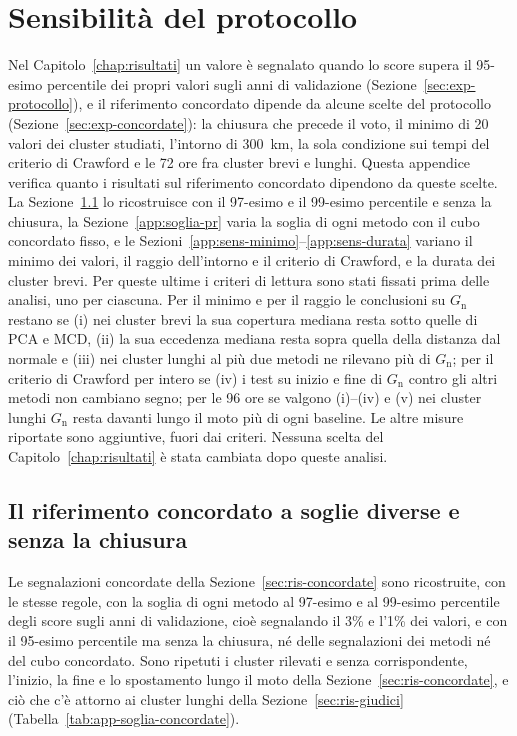 \chapter{Sensibilità del protocollo}
\label{app:soglia}

Nel Capitolo~\ref{chap:risultati} un valore è segnalato quando lo score supera il 95-esimo percentile dei propri valori sugli anni di validazione (Sezione~\ref{sec:exp-protocollo}), e il riferimento concordato dipende da alcune scelte del protocollo (Sezione~\ref{sec:exp-concordate}): la chiusura che precede il voto, il minimo di 20 valori dei cluster studiati, l'intorno di 300~km, la sola condizione sui tempi del criterio di Crawford e le 72 ore fra cluster brevi e lunghi. Questa appendice verifica quanto i risultati sul riferimento concordato dipendono da queste scelte. La Sezione~\ref{app:soglia-concordate} lo ricostruisce con il 97-esimo e il 99-esimo percentile e senza la chiusura, la Sezione~\ref{app:soglia-pr} varia la soglia di ogni metodo con il cubo concordato fisso, e le Sezioni~\ref{app:sens-minimo}--\ref{app:sens-durata} variano il minimo dei valori, il raggio dell'intorno e il criterio di Crawford, e la durata dei cluster brevi. Per queste ultime i criteri di lettura sono stati fissati prima delle analisi, uno per ciascuna. Per il minimo e per il raggio le conclusioni su $G_{\mathrm{n}}$ restano se (i) nei cluster brevi la sua copertura mediana resta sotto quelle di PCA e MCD, (ii) la sua eccedenza mediana resta sopra quella della distanza dal normale e (iii) nei cluster lunghi al più due metodi ne rilevano più di $G_{\mathrm{n}}$; per il criterio di Crawford per intero se (iv) i test su inizio e fine di $G_{\mathrm{n}}$ contro gli altri metodi non cambiano segno; per le 96 ore se valgono (i)--(iv) e (v) nei cluster lunghi $G_{\mathrm{n}}$ resta davanti lungo il moto più di ogni baseline. Le altre misure riportate sono aggiuntive, fuori dai criteri. Nessuna scelta del Capitolo~\ref{chap:risultati} è stata cambiata dopo queste analisi.

\section{Il riferimento concordato a soglie diverse e senza la chiusura}
\label{app:soglia-concordate}

Le segnalazioni concordate della Sezione~\ref{sec:ris-concordate} sono ricostruite, con le stesse regole, con la soglia di ogni metodo al 97-esimo e al 99-esimo percentile degli score sugli anni di validazione, cioè segnalando il 3\% e l'1\% dei valori, e con il 95-esimo percentile ma senza la chiusura, né delle segnalazioni dei metodi né del cubo concordato. Sono ripetuti i cluster rilevati e senza corrispondente, l'inizio, la fine e lo spostamento lungo il moto della Sezione~\ref{sec:ris-concordate}, e ciò che c'è attorno ai cluster lunghi della Sezione~\ref{sec:ris-giudici} (Tabella~\ref{tab:app-soglia-concordate}).

